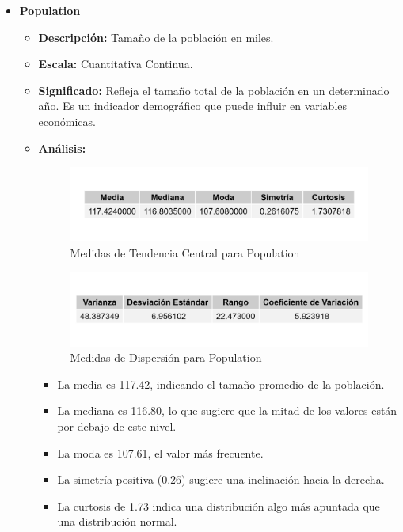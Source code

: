 \documentclass{article}
\begin{document}
\begin{itemize}
    \item \textbf{Population}
    \begin{itemize}
        \item \textbf{Descripción:} Tamaño de la población en miles.
        \item \textbf{Escala:} Cuantitativa Continua.
        \item \textbf{Significado:} Refleja el tamaño total de la población en un determinado año. Es un indicador demográfico que puede influir en variables económicas.
        \item \textbf{Análisis:} 
        \begin{figure}[H]
            \centering
            \includegraphics[width=\textwidth]{MTC/Population_central.png}
            \caption{Medidas de Tendencia Central para Population}
        \end{figure}
        \begin{figure}[H]
            \centering
            \includegraphics[width=\textwidth]{MTC/Population_dispersion.png}
            \caption{Medidas de Dispersión para Population}
        \end{figure}
            \begin{itemize}
                \item La media es 117.42, indicando el tamaño promedio de la población.
                \item La mediana es 116.80, lo que sugiere que la mitad de los valores están por debajo de este nivel.
                \item La moda es 107.61, el valor más frecuente.
                \item La simetría positiva (0.26) sugiere una inclinación hacia la derecha.
                \item La curtosis de 1.73 indica una distribución algo más apuntada que una distribución normal.

\end{itemize}
\end{itemize}
\end{itemize}
\end{document}
